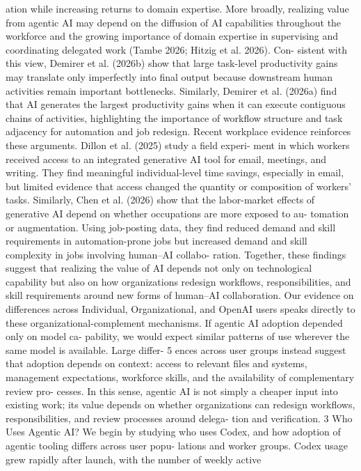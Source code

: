 ation while increasing returns to domain expertise. More broadly, realizing value from agentic AI may
depend on the diffusion of AI capabilities throughout the workforce and the growing importance of
domain expertise in supervising and coordinating delegated work (Tambe 2026; Hitzig et al. 2026). Con-
sistent with this view, Demirer et al. (2026b) show that large task-level productivity gains may translate
only imperfectly into final output because downstream human activities remain important bottlenecks.
Similarly, Demirer et al. (2026a) find that AI generates the largest productivity gains when it can execute
contiguous chains of activities, highlighting the importance of workflow structure and task adjacency
for automation and job redesign.
Recent workplace evidence reinforces these arguments. Dillon et al. (2025) study a field experi-
ment in which workers received access to an integrated generative AI tool for email, meetings, and
writing. They find meaningful individual-level time savings, especially in email, but limited evidence
that access changed the quantity or composition of workers’ tasks. Similarly, Chen et al. (2026) show
that the labor-market effects of generative AI depend on whether occupations are more exposed to au-
tomation or augmentation. Using job-posting data, they find reduced demand and skill requirements in
automation-prone jobs but increased demand and skill complexity in jobs involving human–AI collabo-
ration. Together, these findings suggest that realizing the value of AI depends not only on technological
capability but also on how organizations redesign workflows, responsibilities, and skill requirements
around new forms of human–AI collaboration.
Our evidence on differences across Individual, Organizational, and OpenAI users speaks directly
to these organizational-complement mechanisms. If agentic AI adoption depended only on model ca-
pability, we would expect similar patterns of use wherever the same model is available. Large differ-
5
ences across user groups instead suggest that adoption depends on context: access to relevant files and
systems, management expectations, workforce skills, and the availability of complementary review pro-
cesses. In this sense, agentic AI is not simply a cheaper input into existing work; its value depends on
whether organizations can redesign workflows, responsibilities, and review processes around delega-
tion and verification.
3
Who Uses Agentic AI?
We begin by studying who uses Codex, and how adoption of agentic tooling differs across user popu-
lations and worker groups. Codex usage grew rapidly after launch, with the number of weekly active
